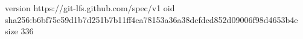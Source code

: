 version https://git-lfs.github.com/spec/v1
oid sha256:b6bf75e59d1b7d251b7b11ff4ca78153a36a38dcfdcd852d09006f98d4653b4e
size 336
